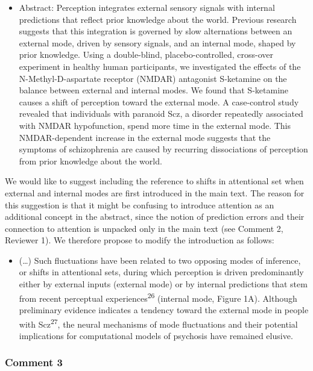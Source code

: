\documentclass[
]{article}
\providecommand{\tightlist}{%
  \setlength{\itemsep}{0pt}\setlength{\parskip}{0pt}}
\begin{document}
\begin{itemize}
\tightlist
\item
  Abstract: Perception integrates external sensory signals with internal
  predictions that reflect prior knowledge about the world. Previous
  research suggests that this integration is governed by slow
  alternations between an external mode, driven by sensory signals, and
  an internal mode, shaped by prior knowledge. Using a double-blind,
  placebo-controlled, cross-over experiment in healthy human
  participants, we investigated the effects of the N-Methyl-D-aspartate
  receptor (NMDAR) antagonist S-ketamine on the balance between external
  and internal modes. We found that S-ketamine causes a shift of
  perception toward the external mode. A case-control study revealed
  that individuals with paranoid Scz, a disorder repeatedly associated
  with NMDAR hypofunction, spend more time in the external mode. This
  NMDAR-dependent increase in the external mode suggests that the
  symptoms of schizophrenia are caused by recurring dissociations of
  perception from prior knowledge about the world.
\end{itemize}

We would like to suggest including the reference to shifts in
attentional set when external and internal modes are first introduced in
the main text. The reason for this suggestion is that it might be
confusing to introduce attention as an additional concept in the
abstract, since the notion of prediction errors and their connection to
attention is unpacked only in the main text (see Comment 2, Reviewer 1).
We therefore propose to modify the introduction as follows:

\begin{itemize}
\tightlist
\item
  (\ldots) Such fluctuations have been related to two opposing modes of
  inference, or shifts in attentional sets, during which perception is
  driven predominantly either by external inputs (external mode) or by
  internal predictions that stem from recent perceptual
  experiences\textsuperscript{26} (internal mode, Figure 1A). Although
  preliminary evidence indicates a tendency toward the external mode in
  people with Scz\textsuperscript{27}, the neural mechanisms of mode
  fluctuations and their potential implications for computational models
  of psychosis have remained elusive.
\end{itemize}

\subsubsection{Comment 3}\label{comment-3}
\end{document}
